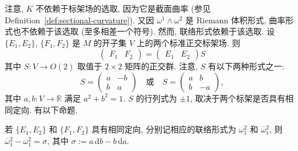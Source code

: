 注意, $K$ 不依赖于标架场的选取, 因为它是截面曲率 (参见 Definition~\ref{def:sectional-curvature}). 又因 $\omega^1\wedge\omega^2$ 是 Riemann 体积形式, 曲率形式也不依赖于该选取 (至多相差一个符号). 然而, 联络形式依赖于该选取. 设 $\{E_1,E_2\}$, $\{F_1,F_2\}$ 是 $M$ 的开子集 $V$ 上的两个标准正交标架场. 则
\[
  \begin{pmatrix}F_1&F_2\end{pmatrix}=\begin{pmatrix}E_1&E_2\end{pmatrix}S
\]
其中 $S:V\to O(2)$ 取值于 $2\times2$ 矩阵的正交群. 注意, $S$ 有以下两种形式之一:
\[
  S=\begin{pmatrix}a&-b\\b&a\end{pmatrix}
  \quad\text{或}\quad S=\begin{pmatrix}a&b\\b&-a\end{pmatrix},
\]
其中 $a,b:V\to\mathbb{R}$ 满足 $a^2+b^2=1$. $S$ 的行列式为 $\pm1$, 取决于两个标架是否具有相同定向. 有以下命题.

\begin{RiemannProposition}\label{prop:connection-form-under-oriented-frame-change}
若 $\{E_1,E_2\}$ 和 $\{F_1,F_2\}$ 具有相同定向, 分别记相应的联络形式为 $\omega_1^2$ 和 $\overline\omega{}_1^2$, 则 $\overline\omega{}_1^2-\omega_1^2=\sigma$, 其中 $\sigma:=a\,\mathrm{d}b-b\,\mathrm{d}a$.
\end{RiemannProposition}


